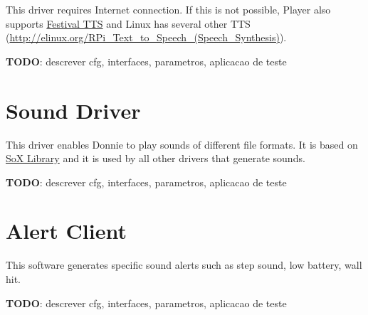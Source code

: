 This driver requires Internet connection. If this is not possible, Player also supports \href{http://playerstage.sourceforge.net/doc/Player-svn/player/group__driver__festival.html}{Festival TTS} and Linux has several other TTS (\url{http://elinux.org/RPi_Text_to_Speech_(Speech_Synthesis)}).

{\bf TODO}: descrever cfg, interfaces, parametros, aplicacao de teste

\section{Sound Driver}
\label{sec:player_sound}

This driver enables Donnie to play sounds of different file formats. It is based on \href{http://sox.sourceforge.net/libsox.html}{SoX Library} and it is used by all other drivers that generate sounds.

{\bf TODO}: descrever cfg, interfaces, parametros, aplicacao de teste

\section{Alert Client}
\label{sec:player_alert}


This software generates specific sound alerts such as step sound, low battery, wall hit. 

{\bf TODO}: descrever cfg, interfaces, parametros, aplicacao de teste

